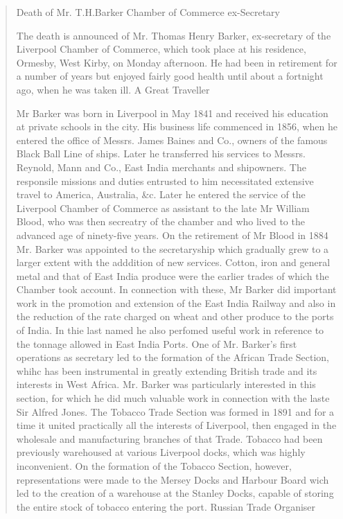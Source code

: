 \begin{quotation}
Death of Mr. T.H.Barker
Chamber of Commerce ex-Secretary

The death is announced of Mr. Thomas Henry Barker, ex-secretary of the Liverpool Chamber of Commerce, which took place at his residence, Ormesby, West Kirby, on Monday afternoon. He had been in retirement for a number of years but enjoyed fairly good health until about a fortnight ago, when he was taken ill.
A Great Traveller

Mr Barker was born in Liverpool in May 1841 and received his education at private schools in the city. His business life commenced in 1856, when he entered the office of Messrs. James Baines and Co., owners of the famous Black Ball Line of ships.  Later he transferred his services to Messrs. Reynold, Mann and Co., East India merchants and shipowners.  The responsile missions and duties entrusted to him necessitated extensive travel to America, Australia, \&c.  Later he entered the service of the Liverpool Chamber of Commerce as assistant to the late Mr William Blood, who was then secreatry of the chamber and who lived to the advanced age of ninety-five years.  On the retirement of Mr Blood in 1884 Mr. Barker was appointed to the secretaryship which gradually grew to a larger extent with the adddition of new services. Cotton, iron and general metal and that of East India produce were the earlier trades of which the Chamber took account.  In connection with these, Mr Barker did important work in the promotion and extension of the East India Railway and also in the reduction of the rate charged on wheat and other produce to the ports of India. In thie last named he also perfomed useful work in reference to the tonnage allowed in East India Ports.
One of Mr. Barker's first operations as secretary led to the formation of the African Trade Section, whihc has been instrumental in greatly extending British trade and its interests in West Africa. Mr. Barker was particularly interested in this section, for which he did much valuable work in connection with the laste Sir Alfred Jones.  The Tobacco Trade Section was formed in 1891 and for a time it united practically all the interests of Liverpool, then engaged in the wholesale and manufacturing branches of that Trade.  Tobacco had been previously warehoused at various Liverpool docks, which was highly inconvenient.  On the formation of the Tobacco Section, however, representations were made to the Mersey Docks and Harbour Board wich led to the creation of a warehouse at the Stanley Docks, capable of storing the entire stock of tobacco entering the port.
Russian Trade Organiser


\end{quotation}
